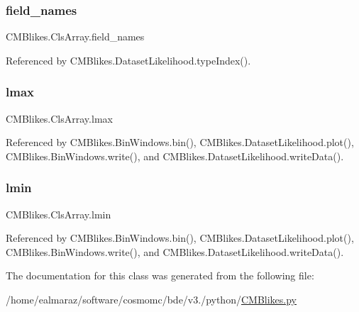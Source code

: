 \subsubsection{\texorpdfstring{field\+\_\+names}{field\_names}}
{\footnotesize\ttfamily C\+M\+Blikes.\+Cls\+Array.\+field\+\_\+names}



Referenced by C\+M\+Blikes.\+Dataset\+Likelihood.\+type\+Index().

\mbox{\label{classCMBlikes_1_1ClsArray_a1e25a11f8dcb03c18c74f76e04299b3f}} 
\subsubsection{\texorpdfstring{lmax}{lmax}}
{\footnotesize\ttfamily C\+M\+Blikes.\+Cls\+Array.\+lmax}



Referenced by C\+M\+Blikes.\+Bin\+Windows.\+bin(), C\+M\+Blikes.\+Dataset\+Likelihood.\+plot(), C\+M\+Blikes.\+Bin\+Windows.\+write(), and C\+M\+Blikes.\+Dataset\+Likelihood.\+write\+Data().

\mbox{\label{classCMBlikes_1_1ClsArray_a6b393b29f03d4865dd01517d0086e82c}} 
\subsubsection{\texorpdfstring{lmin}{lmin}}
{\footnotesize\ttfamily C\+M\+Blikes.\+Cls\+Array.\+lmin}



Referenced by C\+M\+Blikes.\+Bin\+Windows.\+bin(), C\+M\+Blikes.\+Dataset\+Likelihood.\+plot(), C\+M\+Blikes.\+Bin\+Windows.\+write(), and C\+M\+Blikes.\+Dataset\+Likelihood.\+write\+Data().



The documentation for this class was generated from the following file\+:\begin{DoxyCompactItemize}
\item 
/home/ealmaraz/software/cosmomc/bde/v3./python/\mbox{\hyperlink{CMBlikes_8py}{C\+M\+Blikes.\+py}}\end{DoxyCompactItemize}
